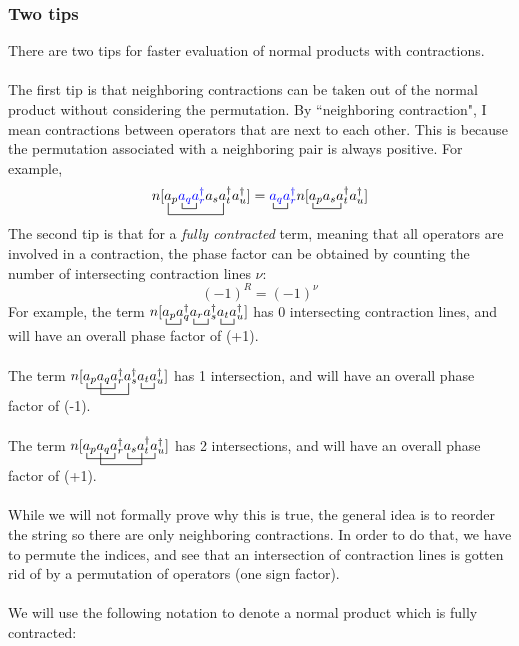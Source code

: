 \documentclass{article}
\newcommand{\ctr}{\bcontraction}
\newcommand{\dg}{\ensuremath{^\dagger} }
\begin{document}
\subsubsection{Two tips}
There are two tips for faster evaluation of normal products with contractions. \\ \\
The first tip is that neighboring contractions can be taken out of the normal product without considering the permutation.
By ``neighboring contraction", I mean contractions between operators that are next to each other.
This is because the permutation associated with a neighboring pair is always positive. 
For example,
\[
\ctr[2ex]{n[}{a}{{}_p{\color{blue} a_q a_r\dg } a_s}{a}
\ctr{n[a_p }{a}{{}_q}{a}
n[a_p {\color{blue} a_q a_r\dg } a_s a_t\dg a_u\dg] = 
\ctr{}{a}{{}_q}{a}
\ctr{{\color{blue} a_q a_r\dg }  n[}{a}{{}_p a_s}{a}
{\color{blue} a_q a_r\dg }  n[a_p a_s a_t\dg a_u\dg] \]
The second tip is that for a \textit{fully contracted} term, meaning that all operators are involved in a contraction, 
the phase factor can be obtained by counting the number of intersecting contraction lines $\nu$: 
\[(-1)^R = (-1)^\nu\]
For example, the term 
$\ctr{n[}{a}{{}_p}{a}
\ctr{n[a_p a_q\dg  }{a}{{}_r }{a}
\ctr{n[a_p a_q\dg  a_r a_s\dg}{a}{{}_t}{a}
n[a_p a_q\dg  a_r a_s\dg a_t a_u\dg] $
has 0 intersecting contraction lines, and will have an overall phase factor of (+1).  \\ \\
The term 
$\ctr{n[}{a}{{}_p a_q}{a}
\ctr[2ex]{n[a_p }{a}{{}_q a_r\dg }{a}
\ctr{n[a_p a_q a_r\dg a_s\dg  }{a}{{}_t}{a}
n[a_p a_q a_r\dg a_s\dg a_t a_u\dg] $ has 1 intersection, and will have an overall phase factor of (-1).  \\ \\
The term
$\ctr{n[}{a}{{}_p a_q}{a}
\ctr[2ex]{n[a_p }{a}{{}_q a_r\dg a_s }{a}
\ctr{n[a_p a_q a_r\dg }{a}{{}_s a_t\dg }{a}
n[a_p a_q a_r\dg a_s a_t\dg a_u\dg] $ has 2 intersections, and will have an overall phase factor of (+1). \\ \\
While we will not formally prove why this is true, the general idea is to reorder the string so there are only neighboring contractions.
In order to do that, we have to permute the indices, and see that an intersection of contraction lines is gotten rid of by a permutation of operators (one sign factor).
\\ \\
We will use the following notation to denote a normal product which is fully contracted: 
\end{document}
